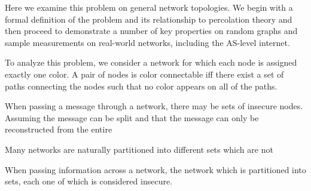 \documentclass[aps, prl, twocolumn, a4paper, floatfix]{revtex4}
\begin{document}
Here we examine this problem on general network topologies.  
We begin with a formal definition of the problem and its relationship to percolation theory and then proceed to demonstrate a number of key properties on random graphs and sample measurements on real-world networks, including the AS-level internet.

To analyze this problem, we consider a network for which each node is assigned exactly one color.
A pair of nodes is color connectable iff there exist a set of paths connecting the nodes such that no color appears on all of the paths.  


When passing a message through a network, there may be sets of insecure nodes.
Assuming the message can be split and that the message can only be reconstructed from the entire 

Many networks are naturally partitioned into different sets which are not 

When passing information across a network, the network which is partitioned into sets, each one of which is considered insecure.
\end{document}
